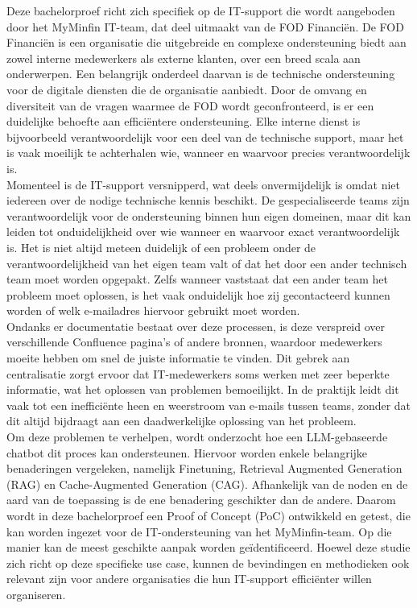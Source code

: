 Deze bachelorproef richt zich specifiek op de IT-support die wordt aangeboden door het MyMinfin IT-team, dat deel uitmaakt van de FOD Financiën. De FOD Financiën is een organisatie die uitgebreide en complexe ondersteuning biedt aan zowel interne medewerkers als externe klanten, over een breed scala aan onderwerpen. Een belangrijk onderdeel daarvan is de technische ondersteuning voor de digitale diensten die de organisatie aanbiedt. Door de omvang en diversiteit van de vragen waarmee de FOD wordt geconfronteerd, is er een duidelijke behoefte aan efficiëntere ondersteuning. Elke interne dienst is bijvoorbeeld verantwoordelijk voor een deel van de technische support, maar het is vaak moeilijk te achterhalen wie, wanneer en waarvoor precies verantwoordelijk is.
\\[1em]
Momenteel is de IT-support versnipperd, wat deels onvermijdelijk is omdat niet iedereen over de nodige technische kennis beschikt. De gespecialiseerde teams zijn verantwoordelijk voor de ondersteuning binnen hun eigen domeinen, maar dit kan leiden tot onduidelijkheid over wie wanneer en waarvoor exact verantwoordelijk is. Het is niet altijd meteen duidelijk of een probleem onder de verantwoordelijkheid van het eigen team valt of dat het door een ander technisch team moet worden opgepakt. Zelfs wanneer vaststaat dat een ander team het probleem moet oplossen, is het vaak onduidelijk hoe zij gecontacteerd kunnen worden of welk e-mailadres hiervoor gebruikt moet worden.
\\[1em]
Ondanks er documentatie bestaat over deze processen, is deze verspreid over verschillende Confluence pagina’s of andere bronnen, waardoor medewerkers moeite hebben om snel de juiste informatie te vinden. Dit gebrek aan centralisatie zorgt ervoor dat IT-medewerkers soms werken met zeer beperkte informatie, wat het oplossen van problemen bemoeilijkt. In de praktijk leidt dit vaak tot een inefficiënte heen en weerstroom van e-mails tussen teams, zonder dat dit altijd bijdraagt aan een daadwerkelijke oplossing van het probleem.
\\[1em]
Om deze problemen te verhelpen, wordt onderzocht hoe een LLM-gebaseerde chatbot dit proces kan ondersteunen. Hiervoor worden enkele belangrijke benaderingen vergeleken, namelijk Finetuning, Retrieval Augmented Generation (RAG) en Cache-Augmented Generation (CAG). Afhankelijk van de noden en de aard van de toepassing is de ene benadering geschikter dan de andere. Daarom wordt in deze bachelorproef een Proof of Concept (PoC) ontwikkeld en getest, die kan worden ingezet voor de IT-ondersteuning van het MyMinfin-team. Op die manier kan de meest geschikte aanpak worden geïdentificeerd. Hoewel deze studie zich richt op deze specifieke use case, kunnen de bevindingen en methodieken ook relevant zijn voor andere organisaties die hun IT-support efficiënter willen organiseren.

